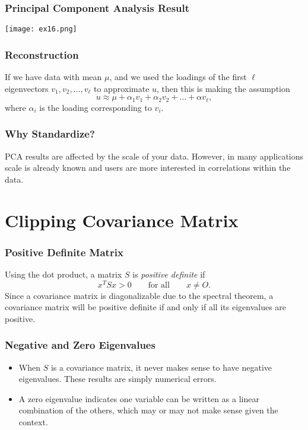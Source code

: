 \documentclass{beamer}
\begin{document}
\begin{frame}
\frametitle{Principal Component Analysis Result}
\begin{center}
\texttt{[image: ex16.png]}
\end{center}

\end{frame}

\begin{frame}
\frametitle{Reconstruction}
If we have data with mean $\mu$, and we used the loadings of the first $\ell$ eigenvectors $v_1, v_2,\ldots, v_\ell$ to approximate $u$, then this is making the assumption
$$
u \approx \mu + \alpha_1 v_1 + \alpha_2 v_2+\ldots + \alpha v_\ell,
$$
where $\alpha_i$ is the loading corresponding to $v_i$. 

\end{frame}

\begin{frame}
\frametitle{Why Standardize?}
PCA results are affected by the scale of your data. However, in many applications scale is already known and users are more interested in correlations within the data. 
\end{frame}

\section{Clipping Covariance Matrix}

\begin{frame}
\frametitle{Positive Definite Matrix}
Using the dot product, a matrix $S$ is {\it positive definite} if
$$
x^T S x > 0 \qquad\text{for all}\qquad x \neq O.
$$
Since a covariance matrix is diagonalizable due to the spectral theorem, a covariance matrix will be positive definite if and only if all its eigenvalues are positive.
\end{frame}

\begin{frame}
\frametitle{Negative and Zero Eigenvalues}

\begin{itemize}
\item When $S$ is a covariance matrix, it never makes sense to have negative eigenvalues. These results are simply numerical errors.
\item A zero eigenvalue indicates one variable can be written as a linear combination of the others, which may or may not make sense given the context.
\end{itemize}

\end{frame}
\end{document}
